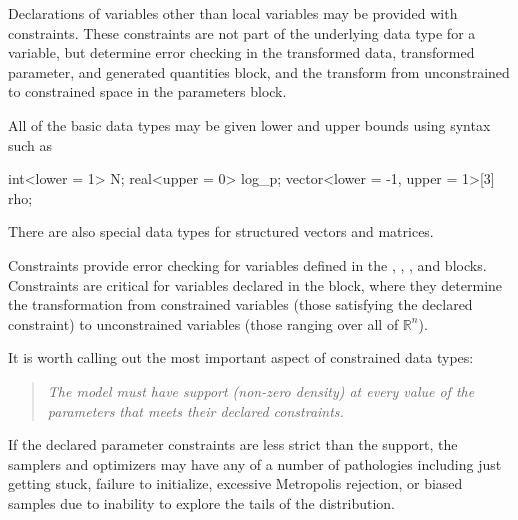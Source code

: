 Declarations of variables other than local variables may be provided
with constraints.  These constraints are not part of the underlying
data type for a variable, but determine error checking in the
transformed data, transformed parameter, and generated quantities
block, and the transform from unconstrained to constrained space in
the parameters block.

All of the basic data types may be given lower and upper bounds using
syntax such as
%
\begin{stancode}
int<lower = 1> N;
real<upper = 0> log_p;
vector<lower = -1, upper = 1>[3] rho;
\end{stancode}

There are also special data types for structured vectors and
matrices.

Constraints provide error checking for variables defined in the ,
, , and 
 blocks.
%
Constraints are critical for variables declared in the
 block, where they determine the transformation from
constrained variables (those satisfying the declared constraint) to
unconstrained variables (those ranging over all of $\mathbb{R}^n$).

It is worth calling out the most important aspect of constrained data
types: 
%
\begin{quote}
\it
The model must have support (non-zero density) at every value of the
parameters that meets their declared constraints.
\end{quote}
%
If the declared parameter constraints are less strict than the
support, the samplers and optimizers may have any of a number of
pathologies including just getting stuck, failure to initialize,
excessive Metropolis rejection, or biased samples due to inability to
explore the tails of the distribution.

